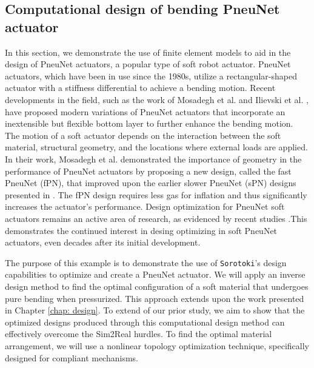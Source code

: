 \subsection{Computational design of bending PneuNet actuator}
\label{sec:C5:pneunet_opt}
In this section, we demonstrate the use of finite element models to aid in the design of PneuNet actuators, a popular type of soft robot actuator. PneuNet actuators, which have been in use since the 1980s, utilize a rectangular-shaped actuator with a stiffness differential to achieve a bending motion. Recent developments in the field, such as the work of Mosadegh et al. \cite{Mosadegh2014} and Ilievski et al. \cite{Ilievski2011Feb}, have proposed modern variations of PneuNet actuators that incorporate an inextensible but flexible bottom layer to further enhance the bending motion. The motion of a soft actuator depends on the interaction between the soft material, structural geometry, and the locations where external loads are applied. In their work, Mosadegh et al. \cite{Mosadegh2014} demonstrated the importance of geometry in the performance of PneuNet actuators by proposing a new design, called the fast PneuNet (fPN), that improved upon the earlier slower PneuNet (sPN) designs presented in \cite{Ilievski2011Feb}. The fPN design requires less gas for inflation and thus significantly increases the actuator's performance. Design optimization for PneuNet soft actuators remains an active area of research, as evidenced by recent studies \cite{Smith2022,Raeisinezhad2021May}.This demonstrates the continued interest in desing optimizing in soft PneuNet actuators, even decades after its initial development.

The purpose of this example is to demonstrate the use of \texttt{Sorotoki}'s design capabilities to optimize and create a PneuNet actuator. We will apply an inverse design method to find the optimal configuration of a soft material that undergoes pure bending when pressurized. This approach extends upon the work presented in Chapter \ref{chap: design}. To extend of our prior study, we aim to show that the optimized designs produced through this computational design method can effectively overcome the Sim2Real hurdles. To find the optimal material arrangement, we will use a nonlinear topology optimization technique, specifically designed for compliant mechanisms.

